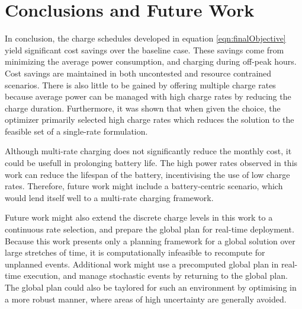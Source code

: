 \section{Conclusions and Future Work }
In conclusion, the charge schedules developed in equation \ref{eqn:finalObjective} yield significant cost savings over the baseline case. These savings come from minimizing the average power consumption, and charging during off-peak hours. Cost savings are maintained in both uncontested and resource contrained scenarios.  There is also little to be gained by offering multiple charge rates because average power can be managed with high charge rates by reducing the charge duration. Furthermore, it was shown that when given the choice, the optimizer primarily selected high charge rates which reduces the solution to the feasible set of a single-rate formulation.
\par  Although multi-rate charging does not significantly reduce the monthly cost, it could be usefull in prolonging battery life. The high power rates observed in this work can reduce the lifespan of the battery, incentivising the use of low charge rates.  Therefore, future work might include a battery-centric scenario, which would lend itself well to a multi-rate charging framework.
\par Future work might also extend the discrete charge levels in this work to a continuous rate selection, and prepare the global plan for real-time deployment.  Because this work presents only a planning framework for a global solution over large stretches of time, it is computationally infeasible to recompute for unplanned events. Additional work might use a precomputed global plan in real-time execution, and manage stochastic events by returning to the global plan. The global plan could also be taylored for such an environment by optimising in a more robust manner, where areas of high uncertainty are generally avoided.
